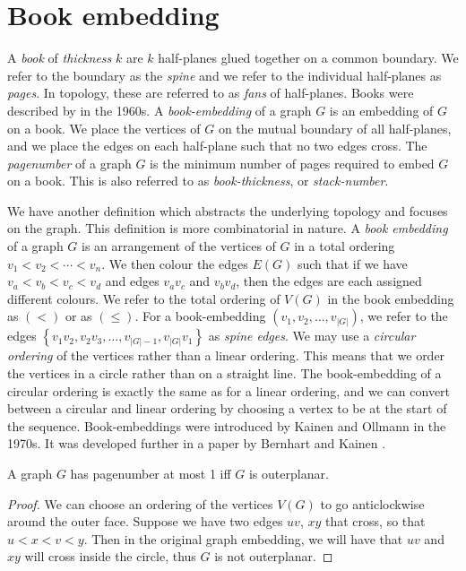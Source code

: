 \section{Book embedding}\label{sec:Book Embedding}
A \textit{book} of \textit{thickness} \(k\) are \(k\) half-planes glued together on a common boundary. We refer to the boundary as the \textit{spine} and we refer to the individual half-planes as \textit{pages}. In topology, these are referred to as \textit{fans} of half-planes. Books were described by \textcite{persingerSubsetsNbooksE31966, atneosenOnedimensionalNleavedContinua1972} in the 1960s.
A \textit{book-embedding} of a graph \(G\) is an embedding of \(G\) on a book. We place the vertices of \(G\) on the mutual boundary of all half-planes, and we place the edges on each half-plane such that no two edges cross.
The \textit{pagenumber} of a graph \(G\) is the minimum number of pages required to embed \(G\) on a book. This is also referred to as \textit{book-thickness}, or \textit{stack-number}.
\par
We have another definition which abstracts the underlying topology and focuses on the graph. This definition is more combinatorial in nature.
A \textit{book embedding} of a graph \(G\) is an arrangement of the vertices of \(G\) in a total ordering \(v_1 < v_2 < \cdots < v_n\). We then colour the edges \(E(G)\) such that if we have \(v_a < v_b < v_c < v_d\) and edges \(v_a v_c\) and \(v_b v_d\), then the edges are each assigned different colours.
We refer to the total ordering of \(V(G)\) in the book embedding as \((<)\) or as \((\leq)\). For a book-embedding \((v_1, v_2, \ldots, v_{|G|})\), we refer to the edges \( \left\{ v_1 v_2, v_2 v_3, \ldots, v_{|G| - 1}, v_{|G|}v_{1} \right\} \) as \textit{spine edges}.
We may use a \textit{circular ordering} of the vertices rather than a linear ordering. This means that we order the vertices in a circle rather than on a straight line. The book-embedding of a circular ordering is exactly the same as for a linear ordering, and we can convert between a circular and linear ordering by choosing a vertex to be at the start of the sequence.
Book-embeddings were introduced by Kainen and Ollmann in the 1970s.\cite{kainenRecentResultsTopological1974, ollmannBookThicknessVarious1973} It was developed further in a paper by Bernhart and Kainen \cite{bernhartBookThicknessGraph1979}.
\begin{lemma}\label{lem:Pagenumber_1}
	A graph \(G\) has pagenumber at most 1 iff \(G\) is outerplanar.
\end{lemma}
\begin{proof}
	We can choose an ordering of the vertices \(V(G)\) to go anticlockwise around the outer face. Suppose we have two edges \(uv\), \(xy\) that cross, so that \(u < x < v < y\). Then in the original graph embedding, we will have that \(uv\) and \(xy\) will cross inside the circle, thus \(G\) is not outerplanar.
\end{proof}
